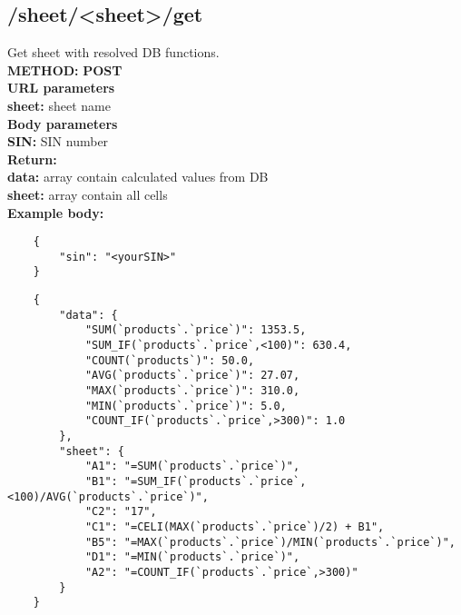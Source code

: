 \documentclass[a4paper, 12pt]{report}
\begin{document}
\subsection{/sheet/<sheet>/get}
Get sheet with resolved DB functions.\\
\textbf{\color{redText} METHOD: } \textbf{POST} \\
\textbf{\color{redText} URL parameters} \\
\textbf{sheet: } sheet name\\
\textbf{\color{redText} Body parameters} \\
\textbf{SIN: } SIN number\\
\textbf{\color{redText} Return: } \\
\textbf{data: } array contain calculated values from DB\\
\textbf{sheet: } array contain all cells\\
\textbf{\color{redText} Example body: }
\begin{lstlisting}
    {
        "sin": "<yourSIN>"
    }
\end{lstlisting}

\begin{lstlisting}
    {
        "data": {
            "SUM(`products`.`price`)": 1353.5,
            "SUM_IF(`products`.`price`,<100)": 630.4,
            "COUNT(`products`)": 50.0,
            "AVG(`products`.`price`)": 27.07,
            "MAX(`products`.`price`)": 310.0,
            "MIN(`products`.`price`)": 5.0,
            "COUNT_IF(`products`.`price`,>300)": 1.0
        },
        "sheet": {
            "A1": "=SUM(`products`.`price`)",
            "B1": "=SUM_IF(`products`.`price`,<100)/AVG(`products`.`price`)",
            "C2": "17",
            "C1": "=CELI(MAX(`products`.`price`)/2) + B1",
            "B5": "=MAX(`products`.`price`)/MIN(`products`.`price`)",
            "D1": "=MIN(`products`.`price`)",
            "A2": "=COUNT_IF(`products`.`price`,>300)"
        }
    }
\end{lstlisting}
\end{document}
